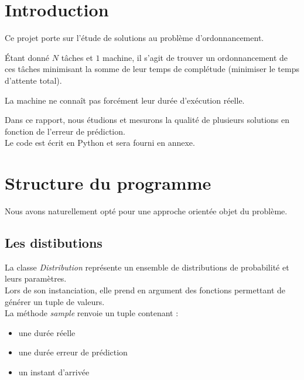 \documentclass[12pt]{article}
\begin{document}
\newpage																		
\renewcommand*\contentsname{Table des Matières}
\tableofcontents 

\newpage
\setlength{\parindent}{2ex}

\section{Introduction}
Ce projet porte sur l'étude de solutions au problème d'ordonnancement. \par

Étant donné $N$ tâches et $1$ machine, il s'agit de trouver un ordonnancement de ces tâches minimisant la somme de leur temps de complétude (minimiser le temps d'attente total). \par

La machine ne connaît pas forcément leur durée d'exécution réelle. \par

Dans ce rapport, nous étudions et mesurons la qualité de plusieurs solutions en fonction de l'erreur de prédiction. \\

Le code est écrit en Python et sera fourni en annexe.

\newpage
\section{Structure du programme}

Nous avons naturellement opté pour une approche orientée objet du problème.

\subsection{Les distibutions}
La classe \emph{Distribution} représente un ensemble de distributions de probabilité et leurs paramètres. \\

Lors de son instanciation, elle prend en argument des fonctions permettant de générer un tuple de valeurs. \\

La méthode \emph{sample} renvoie un tuple contenant :
\begin{itemize}
	\item une durée réelle
	\item une durée erreur de prédiction
	\item un instant d'arrivée
\end{itemize}
\end{document}
